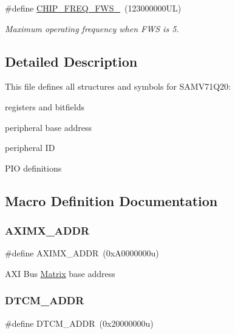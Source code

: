 \begin{DoxyCompactItemize}
\mbox{\label{group__SAMV71Q20__definitions_ga3b66824f858591135877b369f98d48a5}} 
\#define \mbox{\hyperlink{group__SAMV71Q20__definitions_ga3b66824f858591135877b369f98d48a5}{C\+H\+I\+P\+\_\+\+F\+R\+E\+Q\+\_\+\+F\+W\+S\+\_}}~(123000000\+U\+L)
\begin{DoxyCompactList}\small\item\em Maximum operating frequency when F\+WS is 5. \end{DoxyCompactList}\end{DoxyCompactItemize}


\subsection{Detailed Description}
This file defines all structures and symbols for S\+A\+M\+V71\+Q20\+:
\begin{DoxyItemize}
\item registers and bitfields
\item peripheral base address
\item peripheral ID
\item P\+IO definitions 
\end{DoxyItemize}

\subsection{Macro Definition Documentation}
\mbox{\label{group__SAMV71Q20__definitions_ga2fb7cc681bf5e7fbce5e3635b72a330a}} 
\subsubsection{\texorpdfstring{AXIMX\_ADDR}{AXIMX\_ADDR}}
{\footnotesize\ttfamily \#define A\+X\+I\+M\+X\+\_\+\+A\+D\+DR~(0x\+A0000000u)}

A\+XI Bus \mbox{\hyperlink{structMatrix}{Matrix}} base address \mbox{\label{group__SAMV71Q20__definitions_ga26626a425f7ebb3a0c2dbc276f0d9f78}} 
\subsubsection{\texorpdfstring{DTCM\_ADDR}{DTCM\_ADDR}}
{\footnotesize\ttfamily \#define D\+T\+C\+M\+\_\+\+A\+D\+DR~(0x20000000u)}

